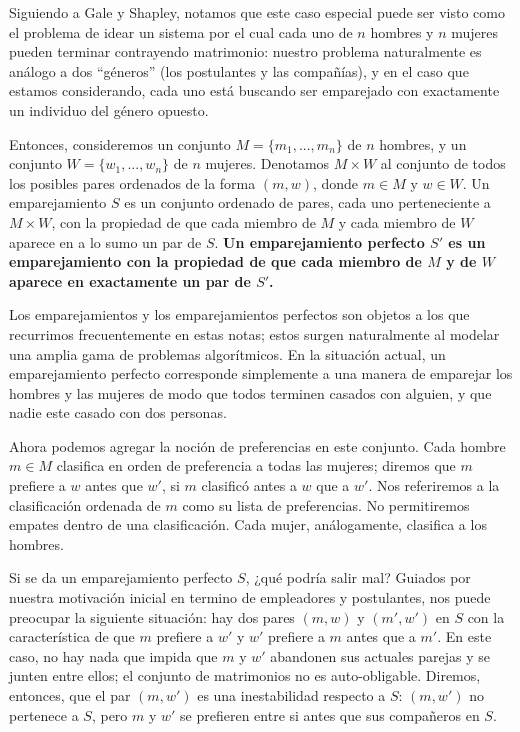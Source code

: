 \documentclass[a4paper, 12pt]{book}
\theoremstyle{dotless}
\begin{document}
Siguiendo a Gale y Shapley, notamos que este caso especial puede ser visto como el problema de idear un sistema por el cual cada uno de $n$ hombres y $n$ mujeres pueden terminar contrayendo matrimonio: nuestro problema naturalmente es análogo a dos ``géneros'' (los postulantes y las compañías), y en el caso que estamos considerando, cada uno está buscando ser emparejado con exactamente un individuo del género opuesto.

Entonces, consideremos un conjunto $M =\{m_1, ...,m_n\}$ de $n$ hombres, y un conjunto  $W =\{w_1, ...,w_n\}$ de $n$ mujeres. Denotamos $M \times W$ al conjunto de todos los posibles pares ordenados de la forma $(m, w)$, donde $m \in M$ y  $w \in W $. Un emparejamiento $S$ es un conjunto ordenado de pares, cada uno perteneciente a $M \times W$, con la propiedad de que cada miembro de $M$ y cada miembro de $W$ aparece en a lo sumo un par de $S$. \textbf{Un emparejamiento perfecto $S'$ es un emparejamiento con la propiedad de que cada miembro de $M$ y de $W$ aparece en exactamente un par de $S'$.}
 
Los emparejamientos y los emparejamientos perfectos son objetos a los que recurrimos frecuentemente en estas notas; estos surgen naturalmente al modelar una amplia gama de problemas algorítmicos. En la situación actual, un emparejamiento perfecto corresponde simplemente a una manera de emparejar los hombres y las mujeres de modo que todos terminen casados con alguien, y que nadie este casado con dos personas.

Ahora podemos agregar la noción de preferencias en este conjunto. Cada hombre $m \in M$  clasifica en orden de preferencia a todas las mujeres; diremos que $m$ prefiere a $w$ antes que $w'$, si $m$ clasificó antes a $w$ que a $w'$. Nos referiremos a la clasificación ordenada de $m$ como su lista de preferencias. No permitiremos empates dentro de una clasificación. Cada mujer, análogamente, clasifica a los hombres. 

Si se da un emparejamiento perfecto $S$, ¿qué podría salir mal? Guiados por nuestra motivación inicial en termino de empleadores y postulantes, nos puede preocupar la siguiente situación: hay dos pares $(m, w)$ y $(m', w')$ en $S$ con la característica de que $m$ prefiere a $w'$ y $w'$ prefiere a $m$ antes que a $m'$. En este caso, no hay nada que impida que $m$ y $w'$ abandonen sus actuales parejas y se junten entre ellos; el conjunto de matrimonios no es auto-obligable. Diremos, entonces, que el par $(m,w')$ es una inestabilidad respecto a $S$: $(m,w')$ no pertenece a $S$, pero $m$ y $w'$ se prefieren entre si antes que sus compañeros en $S$. 
   
\end{document}
